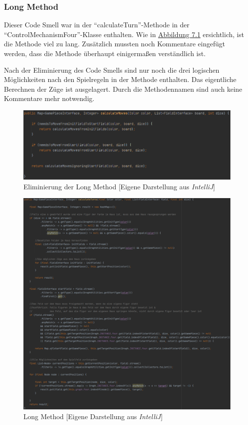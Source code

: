 \subsubsection{Long Method}
\noindent Dieser Code Smell war in der \enquote{calculateTurn}-Methode in der \enquote{ControlMechanismFour}-Klasse enthalten. Wie in \hyperref[fig:longmethod]{Abbildung 7.1} ersichtlich, ist die Methode viel zu lang. Zusätzlich mussten noch Kommentare eingefügt werden, dass die Methode überhaupt einigermaßen verständlich ist. 

Nach der Eliminierung des Code Smells sind nur noch die drei logischen Möglichkeiten nach den Spielregeln in der Methode enthalten. Das eigentliche Berechnen der Züge ist ausgelagert. Durch die Methodennamen sind auch keine Kommentare mehr notwendig.

\begin{figure}[htbp]
\centering
\centerline{\includegraphics[scale=.5]{longmethodsolution}}
\caption{Eliminierung der Long Method [Eigene Darstellung aus \emph{IntelliJ}]}
\label{fig:longmethodsolution}
\end{figure}

\begin{figure}[htbp]
\centering
\centerline{\includegraphics[scale=.65]{longmethod}}
\caption{Long Method [Eigene Darstellung aus \emph{IntelliJ}]}
\label{fig:longmethod}
\end{figure}

